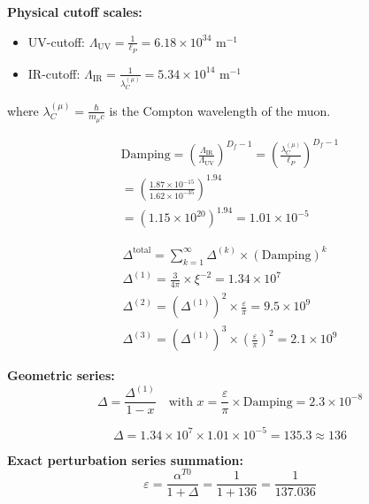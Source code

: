 \documentclass[12pt,a4paper]{article}
\numberwithin{equation}{section}
\newcommand{\xipar}{\xi}
\newcommand{\epsilonT}{\varepsilon}
\newcommand{\alphaT}{\alpha^{T0}}
\newcommand{\Df}{D_f}
\newcommand{\lP}{\ell_P}
\newcommand{\lambdaC}{\lambda_C}
\begin{document}
	\textbf{Physical cutoff scales:}
	\begin{itemize}
		\item UV-cutoff: $\Lambda_{\text{UV}} = \frac{1}{\lP} = 6.18 \times 10^{34}$ m$^{-1}$
		\item IR-cutoff: $\Lambda_{\text{IR}} = \frac{1}{\lambdaC^{(\mu)}} = 5.34 \times 10^{14}$ m$^{-1}$
	\end{itemize}
	
	where $\lambdaC^{(\mu)} = \frac{\hbar}{m_\mu c}$ is the Compton wavelength of the muon.
	
	\begin{align}
		\text{Damping} = \left(\frac{\Lambda_{\text{IR}}}{\Lambda_{\text{UV}}}\right)^{\Df-1} = \left(\frac{\lambdaC^{(\mu)}}{\lP}\right)^{\Df-1}\\
		= \left(\frac{1.87 \times 10^{-15}}{1.62 \times 10^{-35}}\right)^{1.94}\\
		= \left(1.15 \times 10^{20}\right)^{1.94} = 1.01 \times 10^{-5}
		\label{eq:damping_factor}
	\end{align}
	
	\begin{align}
		\Delta^{\text{total}} = \sum_{k=1}^{\infty} \Delta^{(k)} \times (\text{Damping})^k\\
		\Delta^{(1)} = \frac{3}{4\pi} \times \xipar^{-2} = 1.34 \times 10^7\\
		\Delta^{(2)} = (\Delta^{(1)})^2 \times \frac{ \epsilonT}{\pi} = 9.5 \times 10^{9}\\
		\Delta^{(3)} = (\Delta^{(1)})^3 \times \left(\frac{ \epsilonT}{\pi}\right)^2 = 2.1 \times 10^{9}
		\label{eq:perturbation_series}
	\end{align}
	
	\textbf{Geometric series:}
	\begin{equation}
		\Delta = \frac{\Delta^{(1)}}{1-x} \quad \text{with } x = \frac{ \epsilonT}{\pi} \times \text{Damping} = 2.3 \times 10^{-8}
		\label{eq:geometric_series}
	\end{equation}
	
	\begin{equation}
		\Delta = 1.34 \times 10^7 \times 1.01 \times 10^{-5} = 135.3 \approx 136
		\label{eq:delta_final}
	\end{equation}
	
	\textbf{Exact perturbation series summation:}
	\begin{equation}
		\epsilonT = \frac{\alphaT}{1+\Delta} = \frac{1}{1+136} = \frac{1}{137.036}
		\label{eq:epsilon_renormalized}
	\end{equation}
	
\end{document}
